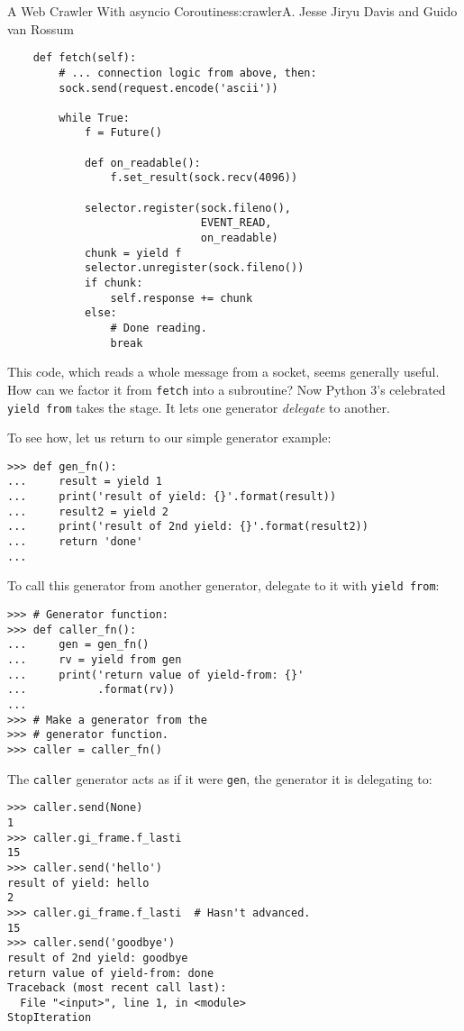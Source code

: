 \begin{aosachapter}{A Web Crawler With asyncio Coroutines}{s:crawler}{A. Jesse Jiryu Davis and Guido van Rossum}
\begin{verbatim}
    def fetch(self):
        # ... connection logic from above, then:
        sock.send(request.encode('ascii'))

        while True:
            f = Future()

            def on_readable():
                f.set_result(sock.recv(4096))

            selector.register(sock.fileno(),
                              EVENT_READ,
                              on_readable)
            chunk = yield f
            selector.unregister(sock.fileno())
            if chunk:
                self.response += chunk
            else:
                # Done reading.
                break
\end{verbatim}

This code, which reads a whole message from a socket, seems generally
useful. How can we factor it from \texttt{fetch} into a subroutine? Now
Python 3's celebrated \texttt{yield from} takes the stage. It lets one
generator \emph{delegate} to another.

To see how, let us return to our simple generator example:

\begin{verbatim}
>>> def gen_fn():
...     result = yield 1
...     print('result of yield: {}'.format(result))
...     result2 = yield 2
...     print('result of 2nd yield: {}'.format(result2))
...     return 'done'
...     
\end{verbatim}

To call this generator from another generator, delegate to it with
\texttt{yield from}:

\begin{verbatim}
>>> # Generator function:
>>> def caller_fn():
...     gen = gen_fn()
...     rv = yield from gen
...     print('return value of yield-from: {}'
...           .format(rv))
...
>>> # Make a generator from the
>>> # generator function.
>>> caller = caller_fn()
\end{verbatim}

The \texttt{caller} generator acts as if it were \texttt{gen}, the
generator it is delegating to:

\begin{verbatim}
>>> caller.send(None)
1
>>> caller.gi_frame.f_lasti
15
>>> caller.send('hello')
result of yield: hello
2
>>> caller.gi_frame.f_lasti  # Hasn't advanced.
15
>>> caller.send('goodbye')
result of 2nd yield: goodbye
return value of yield-from: done
Traceback (most recent call last):
  File "<input>", line 1, in <module>
StopIteration
\end{verbatim}


\end{aosachapter}
